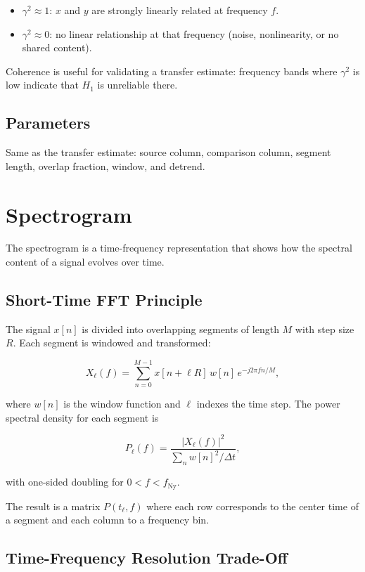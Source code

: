 \documentclass[11pt,a4paper]{article}
\begin{document}
\begin{itemize}
    \item $\gamma^2 \approx 1$: $x$ and $y$ are strongly linearly related at frequency $f$.
    \item $\gamma^2 \approx 0$: no linear relationship at that frequency (noise, nonlinearity, or no shared content).
\end{itemize}

Coherence is useful for validating a transfer estimate: frequency bands where $\gamma^2$ is low indicate that $H_1$ is unreliable there.

\subsection{Parameters}

Same as the transfer estimate: source column, comparison column, segment length, overlap fraction, window, and detrend.

\section{Spectrogram}

The spectrogram is a time-frequency representation that shows how the spectral content of a signal evolves over time.

\subsection{Short-Time FFT Principle}

The signal $x[n]$ is divided into overlapping segments of length $M$ with step size $R$. Each segment is windowed and transformed:

\[
X_\ell(f) = \sum_{n=0}^{M-1} x[n + \ell R]\, w[n]\, e^{-j 2\pi f n / M},
\]

where $w[n]$ is the window function and $\ell$ indexes the time step. The power spectral density for each segment is

\[
P_\ell(f) = \frac{|X_\ell(f)|^2}{\sum_n w[n]^2 / \Delta t},
\]

with one-sided doubling for $0 < f < f_{\mathrm{Ny}}$.

The result is a matrix $P(t_\ell, f)$ where each row corresponds to the center time of a segment and each column to a frequency bin.

\subsection{Time-Frequency Resolution Trade-Off}
\end{document}
